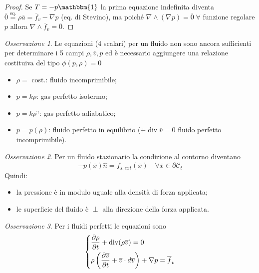 \documentclass{book}
\theoremstyle{plain}
\theoremstyle{plain}
\theoremstyle{plain}
\theoremstyle{plain}
\theoremstyle{plain}
\theoremstyle{definition}
\theoremstyle{remark}
\newtheorem*{oss}{Osservazione}
\theoremstyle{definition}
\begin{document}
\begin{proof}
    Se $T=-p\mathbbm{1}$ la prima equazione indefinita diventa $\overline{0}\overset{\text{eq.}}{=}\rho\overline{a}=\overline{f}_v-\nabla p$ (eq. di Stevino), ma poiché $\nabla\wedge(\nabla p)=\overline{0}\;\forall$ funzione regolare $p$ allora $\nabla\wedge\overline{f}_v=\overline{0}$.
\end{proof}

\begin{oss}
    Le equazioni (4 scalari) per un fluido non sono ancora sufficienti per determinare i 5 campi $\rho, \overline{v}, p$ ed è necessario aggiungere una relazione costituiva del tipo $\phi(p,\rho)=0$
    \begin{itemize}
        \item $\rho =$ cost.: fluido incomprimibile;
        \item $p=k\rho$: gas perfetto isotermo;
        \item $p=k\rho^{\gamma}$: gas perfetto adiabatico;
        \item $p=p(\rho)$: fluido perfetto in equilibrio ($+\operatorname{div}\overline{v}=0$ fluido perfetto incomprimibile).
    \end{itemize}
\end{oss}

\begin{oss}
    Per un fluido stazionario la condizione al contorno diventano
    \begin{displaymath}
        -p(\overline{x})\hat{n}=\overline{f}_{s,ext}(\overline{x}) \quad \forall \overline{x}\in \partial \mathcal{C}_t
    \end{displaymath}
    Quindi:
    \begin{itemize}
        \item la pressione è in modulo uguale alla densità di forza applicata;
        \item le superficie del fluido è $\perp$ alla direzione della forza applicata.
    \end{itemize}
\end{oss}

\begin{oss}
    Per i fluidi perfetti le equazioni sono
    \begin{displaymath}
        \begin{dcases}
        \frac{\partial \rho}{\partial t} + \operatorname{div}(\rho\overline{v})=0 \\
        \rho\left(\frac{\partial\overline{v}}{\partial t} +\overline{v}\cdot d\overline{v}\right) +\nabla p=\overline{f}_v  \end{dcases}
    \end{displaymath}
\end{oss}
\end{document}
